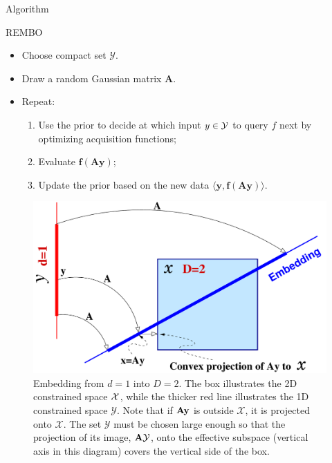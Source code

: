 \documentclass[final]{beamer}
\begin{document}
\begin{frame}[t]
\begin{columns}[T]
\begin{column}{.48\textwidth}
\begin{block}{Algorithm}
   
  \begin{block}{REMBO}
    \begin{itemize}
   \item Choose compact set {\bf \textcolor{myColor}{$\mathbf{\mathcal{Y}}$}}.
   \item Draw a random Gaussian matrix \textcolor{myColor}{$\mathbf{A}$}.
   \item Repeat:
   \begin{enumerate}
    \item Use the prior to decide at which input $y \in \cal Y$ to query $f$ next
    by optimizing acquisition functions;
    \item Evaluate {\bf \textcolor{myColor}{$\mathbf{f(Ay)}$}};
    \item Update the prior based on the new data 
    {\bf \textcolor{myColor}{$\mathbf{\langle{}y, f(Ay)\rangle}$}}.
   \end{enumerate}
  \end{itemize}
  \end{block}
  
  \begin{figure}
\centering
  \includegraphics[scale=0.65]{../paper/figures/projection.pdf}
  \caption{Embedding from $d=1$ into $D=2$. The box illustrates the 2D constrained space ${\cal X}$, while the thicker red line illustrates the 1D constrained space $\mathcal{Y}$. Note that if $\mathbf{A}\mathbf{y}$ is outside $\mathcal{X}$, it is projected onto $\mathcal{X}$. The set $\mathcal{Y}$ must be chosen large enough so that the projection of its image, $\mathbf{A} \mathcal{Y}$, onto the effective subspace (vertical axis in this diagram) covers the vertical side of the box.}

\end{figure}

\end{block}


\end{column}
\end{columns}
\end{frame}
\end{document}
